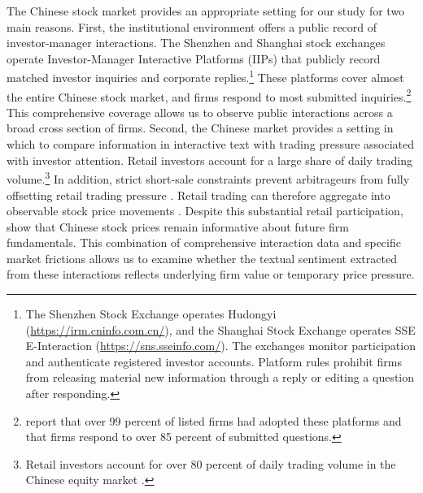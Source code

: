 \documentclass[12pt]{article}
\begin{document}
The Chinese stock market provides an appropriate setting for our study for two main reasons. First, the institutional environment offers a public record of investor-manager interactions. The Shenzhen and Shanghai stock exchanges operate Investor-Manager Interactive Platforms (IIPs) that publicly record matched investor inquiries and corporate replies.\footnote{The Shenzhen Stock Exchange operates Hudongyi (\url{https://irm.cninfo.com.cn/}), and the Shanghai Stock Exchange operates SSE E-Interaction (\url{https://sns.sseinfo.com/}). The exchanges monitor participation and authenticate registered investor accounts. Platform rules prohibit firms from releasing material new information through a reply or editing a question after responding.} These platforms cover almost the entire Chinese stock market, and firms respond to most submitted inquiries.\footnote{\citet{lee2022shall} report that over 99 percent of listed firms had adopted these platforms and that firms respond to over 85 percent of submitted questions.} This comprehensive coverage allows us to observe public interactions across a broad cross section of firms. Second, the Chinese market provides a setting in which to compare information in interactive text with trading pressure associated with investor attention. Retail investors account for a large share of daily trading volume.\footnote{Retail investors account for over 80 percent of daily trading volume in the Chinese equity market \citep{liao2022}.} In addition, strict short-sale constraints prevent arbitrageurs from fully offsetting retail trading pressure \citep{jiang2022}. Retail trading can therefore aggregate into observable stock price movements \citep{bian2026,liao2022}. Despite this substantial retail participation, \citet{carpenter2021} show that Chinese stock prices remain informative about future firm fundamentals. This combination of comprehensive interaction data and specific market frictions allows us to examine whether the textual sentiment extracted from these interactions reflects underlying firm value or temporary price pressure.
\end{document}
